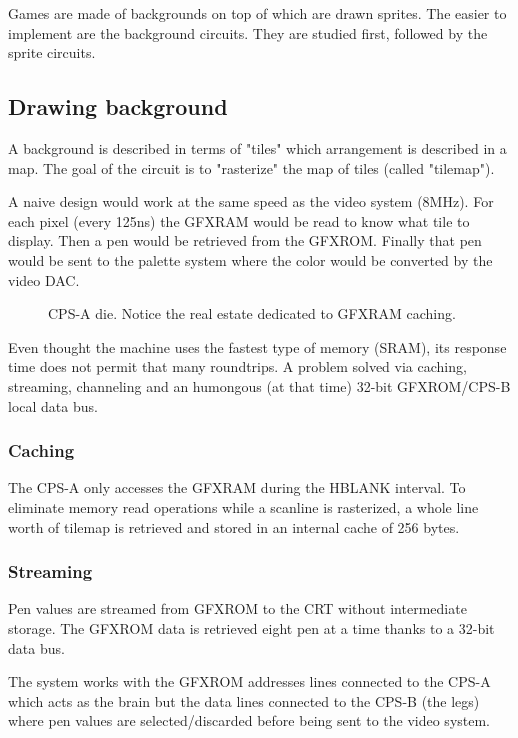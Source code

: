 Games are made of backgrounds on top of which are drawn sprites. The easier to implement are the background circuits. They are studied first, followed by the sprite circuits.

\subsection{Drawing background}

A background is described in terms of "tiles" which arrangement is described in a map. The goal of the circuit is to "rasterize" the map of tiles (called "tilemap").

A naive design would work at the same speed as the video system (8MHz). For each pixel (every 125ns) the GFXRAM would be read to know what tile to display. Then a pen would be retrieved from the GFXROM. Finally that pen would be sent to the palette system where the color would be converted by the video DAC.

 \begin{figure}[H]%
 \caption*{CPS-A die. Notice the real estate dedicated to GFXRAM caching.}%
 \end{figure}%

 Even thought the machine uses the fastest type of memory (SRAM), its response time does not permit that many roundtrips. A problem solved via caching, streaming, channeling and an humongous (at that time) 32-bit GFXROM/CPS-B local data bus. 


\subsubsection{Caching}
The CPS-A only accesses the GFXRAM during the HBLANK interval. To eliminate memory read operations while a scanline is rasterized, a whole line worth of tilemap is retrieved and stored in an internal cache of 256 bytes.




\subsubsection{Streaming}
Pen values are streamed from GFXROM to the CRT without intermediate storage. The GFXROM data is retrieved eight pen at a time thanks to a 32-bit data bus.

The system works with the GFXROM addresses lines connected to the CPS-A which acts as the brain but the data lines  connected to the CPS-B (the legs) where pen values are selected/discarded before being sent to the video system.

